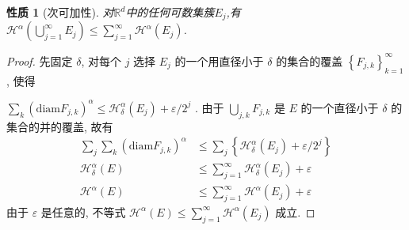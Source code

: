 \documentclass[hyperref,a4paper,UTF8]{ctexart}
\newtheorem{property}{{性质}}
\begin{document}
  \begin{property}[次可加性]
    对$\mathbb{R}^d$中的任何可数集簇${E_j}$,有$\mathcal{H}^{\alpha}\left(\bigcup_{j=1}^{\infty} E_j\right) \leqslant \sum_{j=1}^{\infty} \mathcal{H}^{\alpha}\left(E_j\right)$. 
  \end{property}
  \begin{proof}
    先固定 $\delta$, 对每个 $j$ 选择 $E_j$ 的一个用直径小于 $\delta$ 的集合的覆盖 
    $\left\{F_{j, k}\right\}_{k=1}^{\infty}$, 使得 
    
    $\sum\limits_k\left(\mathrm{diam} F_{j, k}\right)^\alpha \leqslant \mathcal{H}_\delta^\alpha\left(E_j\right)+\varepsilon / 2^j$ .
    由于 $\bigcup\limits_{j, k} F_{j, k}$ 是 $E$ 的一个直径小于 $\delta$ 的集合的并的覆盖, 故有
    $$
      \begin{aligned}
        \sum_{j}\sum\limits_k\left(\mathrm{diam} F_{j, k}\right)^\alpha & \leqslant \sum_{j} \left \{\mathcal{H}_\delta^\alpha\left(E_j\right)+\varepsilon / 2^j \right \}\\
        \mathcal{H}_\delta^\alpha(E) & \leqslant \sum_{j=1}^{\infty} \mathcal{H}_\delta^\alpha \left(E_j\right)+\varepsilon \\
        \mathcal{H}^\alpha(E) & \leqslant \sum_{j=1}^{\infty} \mathcal{H}^\alpha\left(E_j\right)+\varepsilon 
      \end{aligned}
    $$
    由于 $\varepsilon$ 是任意的, 不等式 $\mathcal{H}^\alpha(E)\leqslant \sum_{j=1}^{\infty} \mathcal{H}^\alpha\left(E_j\right)$ 成立.
  \end{proof}
\end{document}
